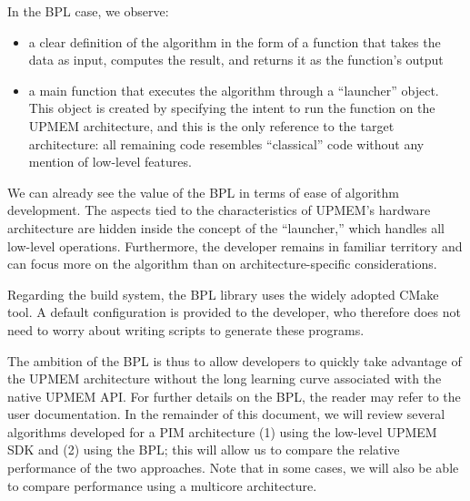 In the BPL case, we observe:
\begin{itemize}
\item a clear definition of the algorithm in the form of a function that takes the data as input, computes the result, and returns it as the function’s output
\item a main function that executes the algorithm through a “launcher” object. This object is created by specifying the intent to run the function on the UPMEM architecture, and this is the only reference to the target architecture: all remaining code resembles “classical” code without any mention of low-level features.
\end{itemize}

We can already see the value of the BPL in terms of ease of algorithm development. The aspects tied to the characteristics of UPMEM’s hardware architecture are hidden inside the concept of the “launcher,” which handles all low-level operations. Furthermore, the developer remains in familiar territory and can focus more on the algorithm than on architecture-specific considerations.

Regarding the build system, the BPL library uses the widely adopted CMake tool. A default configuration is provided to the developer, who therefore does not need to worry about writing scripts to generate these programs.

The ambition of the BPL is thus to allow developers to quickly take advantage of the UPMEM architecture without the long learning curve associated with the native UPMEM API.
For further details on the BPL, the reader may refer to the user documentation. In the remainder of this document, we will review several algorithms developed for a PIM architecture (1) using the low-level UPMEM SDK and (2) using the BPL; this will allow us to compare the relative performance of the two approaches. Note that in some cases, we will also be able to compare performance using a multicore architecture.

